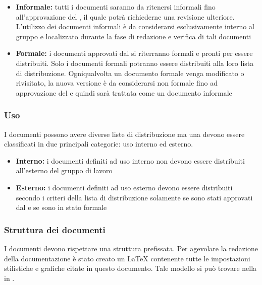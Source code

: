 \documentclass[12pt,a4paper]{article}
\begin{document}
\begin{itemize}
	\item \textbf{Informale:} tutti i documenti saranno da ritenersi informali fino all'approvazione del \PM, il quale potrà richiederne una revisione ulteriore. L'utilizzo dei documenti informali è da considerarsi esclusivamente interno al gruppo e localizzato durante la fase di redazione e verifica di tali documenti
	\item \textbf{Formale:} i documenti approvati dal \PM{} si riterranno formali e pronti per essere distribuiti. Solo i documenti formali potranno essere distribuiti alla loro lista di distribuzione. Ogniqualvolta un documento formale venga modificato o rivisitato, la nuova versione è da considerarsi non formale fino ad approvazione del \PM e quindi sarà trattata come un documento informale
\end{itemize}

\subsubsection{Uso}
I documenti possono avere diverse liste di distribuzione ma una devono essere classificati in due principali categorie: uso interno ed esterno.

\begin{itemize}
	\item \textbf{Interno:} i documenti definiti ad uso interno non devono essere distribuiti all'esterno del gruppo di lavoro
	\item \textbf{Esterno:} i documenti definiti ad uso esterno devono essere distribuiti secondo i criteri della lista di distribuzione solamente se sono stati approvati dal \PM{} e se sono in stato formale
\end{itemize}

\subsubsection{Struttura dei documenti}
I documenti devono rispettare una struttura prefissata. Per agevolare la redazione della documentazione è stato creato un  \LaTeX{} contenente tutte le impostazioni stilistiche e grafiche citate in questo documento. Tale modello si può trovare nella  in .
\end{document}
